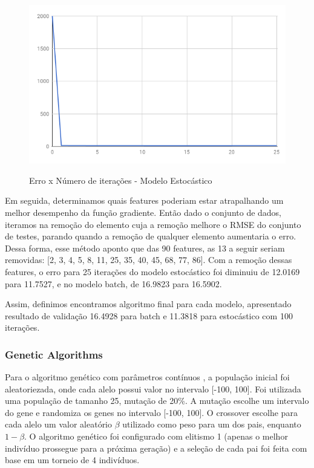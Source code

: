 \documentclass[conference]{IEEEtran}
\begin{document}
\begin{figure}[h!]
	\includegraphics[scale=0.4]{stochastic.png}
	\label{fig:stoc}
	\caption{Erro x Número de iterações - Modelo Estocástico}
\end{figure}

Em seguida, determinamos quais features poderiam estar atrapalhando um melhor desempenho da função gradiente. Então dado o conjunto de dados, iteramos na remoção do elemento cuja a remoção melhore o RMSE do conjunto de testes, parando quando a remoção de qualquer elemento aumentaria o erro. Dessa forma, esse método aponto que das 90 features, as 13 a seguir seriam removidas: [2, 3, 4, 5, 8, 11, 25, 35, 40, 45, 68, 77, 86].
Com a remoção dessas features, o erro para 25 iterações do modelo estocástico foi diminuiu de 12.0169 para 11.7527, e no modelo batch, de 16.9823 para 16.5902.

Assim, definimos encontramos algoritmo final para cada modelo, apresentado resultado de validação 16.4928 para batch e 11.3818 para estocástico com 100 iterações. 

\subsubsection{Genetic Algorithms}
Para o algoritmo genético com parâmetros contínuos \cite{continousgenetics} \cite{continuousgenetics2}, a população inicial foi aleatoriezada, onde cada alelo possui valor no intervalo [-100, 100]. Foi utilizada uma população de tamanho 25, mutação de 20\%. A mutação escolhe um intervalo do gene e randomiza os genes no intervalo [-100, 100]. O crossover escolhe para cada alelo um valor aleatório $\beta$ utilizado como peso para um dos pais, enquanto $1 - \beta$.  O algoritmo genético foi configurado com elitismo 1 (apenas o melhor indivíduo prossegue para a próxima geração) e a seleção de cada pai foi feita com base em um torneio de 4 indivíduos. 
\end{document}
